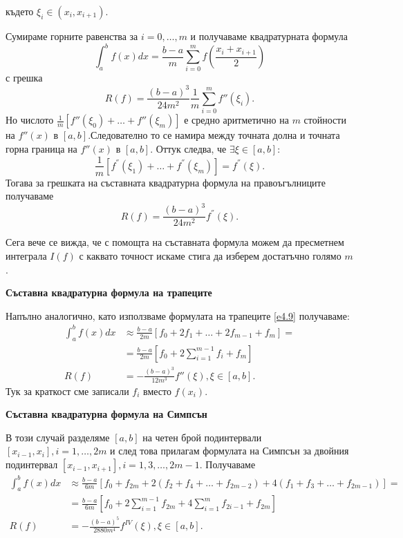 \documentclass[12pt]{article}
\numberwithin{equation}{section}
\numberwithin{theorem}{section}
\numberwithin{definition}{section}
\numberwithin{corollary}{section}
\begin{document}
където $\xi_i\in(x_i,x_{i+1}).$
\par
Сумираме горните равенства за $i=0,\dotso,m$ и получаваме квадратурната формула
\[
\int_a^bf(x)dx = \frac{b-a}{m}\displaystyle\sum_{i=0}^{m}f\left(\frac{x_i+x_{i+1}}{2}\right)
\]
с грешка
\[
R(f) = \frac{(b-a)^3}{24m^2}\frac{1}{m}\displaystyle\sum_{i=0}^mf''(\xi_i).
\]
Но числото $\frac{1}{m}[f''(\xi_0)+\dotso+f''(\xi_m)]$ е средно аритметично на $m$ стойности на $f''(x)$ в $[a,b]$.Следователно то се намира между точната долна и точната горна граница на $f''(x)$ в $[a,b]$. Оттук следва, че $\exists\xi\in[a,b]:$
\[
\frac{1}{m}[f^{''}(\xi_1)+\dotso+f^{''}(\xi_m)] = f^{''}(\xi).
\]
Тогава за грешката на съставната квадратурна формула на правоъгълниците получаваме
\[
R(f) = \frac{(b-a)^3}{24m^2}f^{''}(\xi).
\]
\par
Сега вече се вижда, че с помощта на съставната формула можем да пресметнем интеграла $I(f)$ с каквато точност искаме стига да изберем достатъчно голямо $m$.
\begin{center}
\textbf{Съставна квадратурна формула на трапеците}
\end{center}
\par
Напълно аналогично, като използваме формулата на трапеците \ref{e4.9} получаваме:
\begin{align*}
\int_a^bf(x)dx &\approx \frac{b-a}{2m}[f_0+2f_1+\dotso+2f_{m-1}+f_m]=\\&=\frac{b-a}{2m}[f_0+2\displaystyle\sum_{i=1}^{m-1}f_i+f_m]\\
R(f)&=-\frac{(b-a)^3}{12m^3}f''(\xi), \xi\in[a,b].
\end{align*}
Тук за краткост сме записали $f_i$ вместо $f(x_i)$.
\begin{center}
\textbf{Съставна квадратурна формула на Симпсън}
\end{center}
\par
В този случай разделяме $[a,b]$ на четен брой подинтервали $[x_{i-1},x_i], i=1,\dotso,2m$ и след това прилагам формулата на Симпсън за двойния подинтервал $[x_{i-1},x_{i+1}],i=1,3,\dotso,2m-1$. Получаваме
\begin{align*}
\int_a^bf(x)dx &\approx \frac{b-a}{6m}[f_0+f_{2m}+2(f_2+f_4+\dotso+f_{2m-2})+4(f_1+f_3+\dotso+f_{2m-1})]=\\&=\frac{b-a}{6m}[f_0+2\displaystyle\sum_{i=1}^{m-1}f_{2m}+4\displaystyle\sum_{i=1}^{m}f_{2i-1}+f_{2m}]\\
R(f) &= -\frac{(b-a)^5}{2880m^4}f^{IV}(\xi), \xi\in[a,b].
\end{align*}
\newpage
\end{document}
